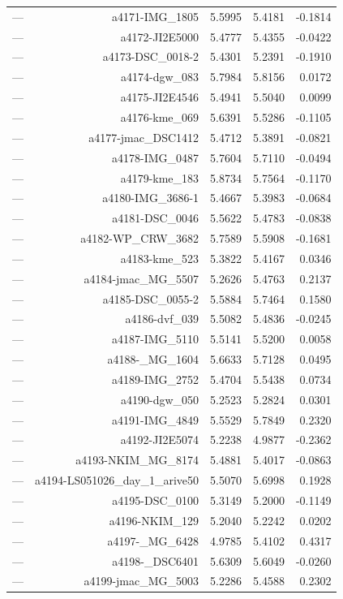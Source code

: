 \begin{table}[htbp]
\begin{tabular}{lrrrr}
— & a4171-IMG_1805 & 5.5995 & 5.4181 & -0.1814 \\
— & a4172-JI2E5000 & 5.4777 & 5.4355 & -0.0422 \\
— & a4173-DSC_0018-2 & 5.4301 & 5.2391 & -0.1910 \\
— & a4174-dgw_083 & 5.7984 & 5.8156 & 0.0172 \\
— & a4175-JI2E4546 & 5.4941 & 5.5040 & 0.0099 \\
— & a4176-kme_069 & 5.6391 & 5.5286 & -0.1105 \\
— & a4177-jmac_DSC1412 & 5.4712 & 5.3891 & -0.0821 \\
— & a4178-IMG_0487 & 5.7604 & 5.7110 & -0.0494 \\
— & a4179-kme_183 & 5.8734 & 5.7564 & -0.1170 \\
— & a4180-IMG_3686-1 & 5.4667 & 5.3983 & -0.0684 \\
— & a4181-DSC_0046 & 5.5622 & 5.4783 & -0.0838 \\
— & a4182-WP_CRW_3682 & 5.7589 & 5.5908 & -0.1681 \\
— & a4183-kme_523 & 5.3822 & 5.4167 & 0.0346 \\
— & a4184-jmac_MG_5507 & 5.2626 & 5.4763 & 0.2137 \\
— & a4185-DSC_0055-2 & 5.5884 & 5.7464 & 0.1580 \\
— & a4186-dvf_039 & 5.5082 & 5.4836 & -0.0245 \\
— & a4187-IMG_5110 & 5.5141 & 5.5200 & 0.0058 \\
— & a4188-_MG_1604 & 5.6633 & 5.7128 & 0.0495 \\
— & a4189-IMG_2752 & 5.4704 & 5.5438 & 0.0734 \\
— & a4190-dgw_050 & 5.2523 & 5.2824 & 0.0301 \\
— & a4191-IMG_4849 & 5.5529 & 5.7849 & 0.2320 \\
— & a4192-JI2E5074 & 5.2238 & 4.9877 & -0.2362 \\
— & a4193-NKIM_MG_8174 & 5.4881 & 5.4017 & -0.0863 \\
— & a4194-LS051026_day_1_arive50 & 5.5070 & 5.6998 & 0.1928 \\
— & a4195-DSC_0100 & 5.3149 & 5.2000 & -0.1149 \\
— & a4196-NKIM_129 & 5.2040 & 5.2242 & 0.0202 \\
— & a4197-_MG_6428 & 4.9785 & 5.4102 & 0.4317 \\
— & a4198-_DSC6401 & 5.6309 & 5.6049 & -0.0260 \\
— & a4199-jmac_MG_5003 & 5.2286 & 5.4588 & 0.2302 \\

\end{tabular}
\end{table}
